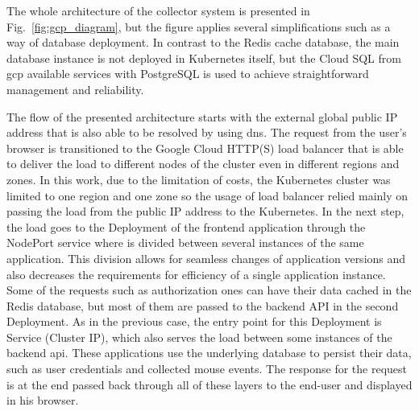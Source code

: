 The whole architecture of the collector system is presented in Fig.~\ref{fig:gcp_diagram}, but the figure applies several simplifications such as a way of database deployment.
In contrast to the Redis cache database, the main database instance is not deployed in Kubernetes itself, but the Cloud SQL from \gls{gcp} available services with \mbox{PostgreSQL} is used to achieve straightforward management and reliability.

The flow of the presented architecture starts with the external global public IP address that is also able to be resolved by using \gls{dns}.
The request from the user's browser is transitioned to the Google Cloud HTTP(S) load balancer that is able to deliver the load to different nodes of the cluster even in different regions and zones.
In this work, due to the limitation of costs, the Kubernetes cluster was limited to one region and one zone so the usage of load balancer relied mainly on passing the load from the public IP address to the Kubernetes.
In the next step, the load goes to the Deployment of the frontend application through the NodePort service where is divided between several instances of the same application.
This division allows for seamless changes of application versions and also decreases the requirements for efficiency of a single application instance.
Some of the requests such as authorization ones can have their data cached in the Redis database, but most of them are passed to the backend API in the second Deployment.
As in the previous case, the entry point for this Deployment is Service (Cluster IP), which also serves the load between some instances of the backend \gls{api}.
These applications use the underlying database to persist their data, such as user credentials and collected mouse events.
The response for the request is at the end passed back through all of these layers to the end-user and displayed in his browser.